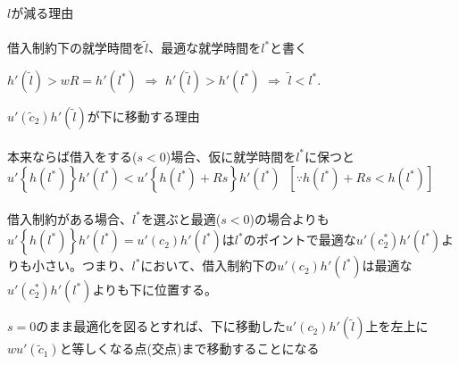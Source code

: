 \begin{frame}[t, label = EquilibriumReasonsOfShifts]{}
$l$が減る理由\\~\\
\pause
借入制約下の就学時間を$\tilde{l}$、最適な就学時間を$l^{*}$と書く
\begin{dinglist}{43}
\vspace{1.0ex}\setlength{\itemsep}{1.0ex}\setlength{\baselineskip}{12pt}
\pause
\item	$h'(\tilde{l})>wR=h'(l^{*})$ \pause
$\Rightarrow$ $h'(\tilde{l})>h'(l^{*})$ \pause
$\Rightarrow$ $\tilde{l}<l^{*}$.
\end{dinglist}

\vspace{2ex}
\pause
$u'(\tilde{c}_{2})h'(\tilde{l})$が下に移動する理由\\~\\

\pause
本来ならば借入をする($s<0$)場合、仮に就学時間を$l^{*}$に保つと$u'\left\{h(l^{*})\right\}h'(l^{*})<u'\left\{h(l^{*})+Rs\right\}h'(l^{*}) \;\; [\because h(l^{*})+Rs<h(l^{*})]$\\~\\

\pause
借入制約がある場合、$l^{*}$を選ぶと最適($s<0$)の場合よりも$u'\left\{h(l^{*})\right\}h'(l^{*})=u'(c_{2})h'(l^{*})$は$l^{*}$のポイントで最適な$u'(c^{*}_{2})h'(l^{*})$よりも小さい。つまり、$l^{*}$において、借入制約下の$u'(c_{2})h'(l^{*})$は最適な$u'(c^{*}_{2})h'(l^{*})$よりも下に位置する。

\begin{dinglist}{43}
\vspace{1.0ex}\setlength{\itemsep}{1.0ex}\setlength{\baselineskip}{12pt}
\pause
\item	$s=0$のまま最適化を図るとすれば、下に移動した$u'(c_{2})h'(\tilde{l})$上を左上に$wu'(\tilde{c}_{1})$と等しくなる点(交点)まで移動することになる
\end{dinglist}
\end{frame}

